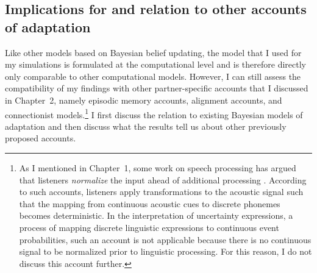 \subsection{Implications for and relation to other accounts of adaptation}










Like other models based on Bayesian belief updating, the model that I used for my simulations
is formulated at the computational level \cite{Marr1982,Anderson1990} 
and is therefore directly only comparable to other computational models. However, I can still assess 
the compatibility of my findings with other partner-specific accounts that I discussed in Chapter~2, namely
episodic memory accounts, alignment accounts, and connectionist models.\footnote{As I mentioned in Chapter~1, some work on speech processing has argued that listeners \textit{normalize} the input ahead of additional processing .
According to such accounts, listeners apply transformations to the acoustic signal such that the mapping from continuous acoustic cues to discrete phonemes becomes deterministic.
In the interpretation of uncertainty expressions, a process of mapping discrete linguistic expressions to continuous event probabilities, such an account is not applicable because
there is no continuous signal to be normalized prior to linguistic processing. For this reason, I do not discuss this account further.} 
 I first discuss the relation to existing Bayesian
 models of adaptation and then discuss what the results tell us about other previously proposed accounts.
  
